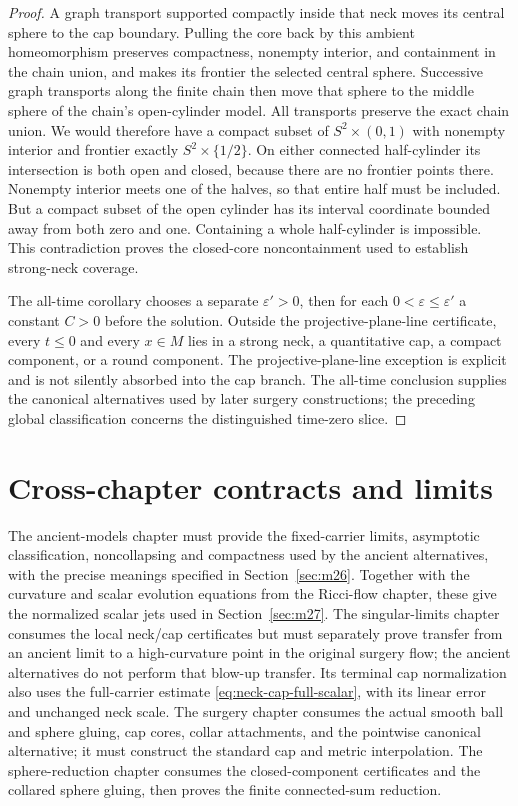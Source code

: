 \begin{proof}
A graph transport supported compactly inside that neck moves its central
sphere to the cap boundary.  Pulling the core back by this ambient
homeomorphism preserves compactness, nonempty interior, and containment in
the chain union, and makes its frontier the selected central sphere.
Successive graph transports along the finite chain then move that sphere
to the middle sphere of the chain's open-cylinder model.  All transports
preserve the exact chain union.  We would therefore have a compact subset
of $S^2\times(0,1)$ with nonempty interior and frontier exactly
$S^2\times\{1/2\}$.  On either connected half-cylinder its intersection is
both open and closed, because there are no frontier points there.  Nonempty
interior meets one of the halves, so that entire half must be included.
But a compact subset of the open cylinder has its interval coordinate
bounded away from both zero and one.  Containing a whole half-cylinder is
impossible.  This contradiction proves the closed-core noncontainment used
to establish strong-neck coverage.

The all-time corollary chooses a separate $\varepsilon'>0$, then for each
$0<\varepsilon\le\varepsilon'$ a constant $C>0$ before the solution.  Outside the
projective-plane-line certificate, every $t\le0$ and every $x\in M$ lies in a
strong neck, a quantitative cap, a compact component, or a round component.
The projective-plane-line exception is explicit and is not silently absorbed
into the cap branch.  The all-time conclusion supplies the canonical
alternatives used by later surgery constructions; the preceding global
classification concerns the distinguished time-zero slice.
\end{proof}

\section{Cross-chapter contracts and limits}
\label{sec:neck-cap-contracts}

The ancient-models chapter must provide the fixed-carrier limits, asymptotic
classification, noncollapsing and compactness used by the ancient alternatives,
with the precise meanings specified in Section~\ref{sec:m26}.
Together with the curvature and scalar evolution equations from the
Ricci-flow chapter, these give the normalized scalar jets used in
Section~\ref{sec:m27}.  The singular-limits chapter consumes the local neck/cap
certificates but must separately prove transfer from an ancient limit to a
high-curvature point in the original surgery flow; the ancient alternatives do not perform
that blow-up transfer.  Its terminal cap normalization also uses the
full-carrier estimate \eqref{eq:neck-cap-full-scalar}, with its linear
error and unchanged neck scale.  The surgery chapter consumes the actual smooth ball
and sphere gluing, cap cores, collar attachments, and the pointwise canonical
alternative; it must construct the standard cap and metric interpolation.
The sphere-reduction chapter consumes the closed-component certificates and
the collared sphere gluing, then proves the finite connected-sum reduction.

